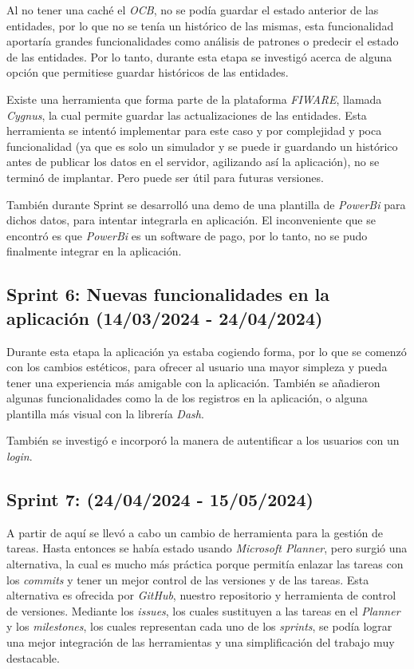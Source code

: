 Al no tener una caché el \textit{OCB}, no se podía guardar el estado anterior de las entidades, por lo que no se tenía un histórico de las mismas, esta funcionalidad aportaría grandes funcionalidades como análisis de patrones o predecir el estado de las entidades. Por lo tanto, durante esta etapa se investigó acerca de alguna opción que permitiese guardar históricos de las entidades.

Existe una herramienta que forma parte de la plataforma \textit{FIWARE}, llamada \textit{Cygnus}, la cual permite guardar las actualizaciones de las entidades. Esta herramienta se intentó implementar para este caso y por complejidad y poca funcionalidad (ya que es solo un simulador y se puede ir guardando un histórico antes de publicar los datos en el servidor, agilizando así la aplicación), no se terminó de implantar. Pero puede ser útil para futuras versiones.

También durante Sprint se desarrolló una demo de una plantilla de \textit{PowerBi} para dichos datos, para intentar integrarla en aplicación. El inconveniente que se encontró es que \textit{PowerBi} es un software de pago, por lo tanto, no se pudo finalmente integrar en la aplicación.



\subsection{Sprint 6: Nuevas funcionalidades en la aplicación (14/03/2024 - 24/04/2024)}

Durante esta etapa la aplicación ya estaba cogiendo forma, por lo que se comenzó con los cambios estéticos, para ofrecer al usuario una mayor simpleza y pueda tener una experiencia más amigable con la aplicación.
También se añadieron algunas funcionalidades como la de los registros en la aplicación, o alguna plantilla más visual con la librería \textit{Dash}.

También se investigó e incorporó la manera de autentificar a los usuarios con un \textit{login}.


\subsection{Sprint 7: (24/04/2024 - 15/05/2024)}

A partir de aquí se llevó a cabo un cambio de herramienta para la gestión de tareas. Hasta entonces se había estado usando \textit{Microsoft Planner}, pero surgió una alternativa, la cual es mucho más práctica porque permitía enlazar las tareas con los \textit{commits} y tener un mejor control de las versiones y de las tareas. Esta alternativa es ofrecida por \textit{GitHub}, nuestro repositorio y herramienta de control de versiones. Mediante los \textit{issues}, los cuales sustituyen a las tareas en el \textit{Planner} y los \textit{milestones}, los cuales representan cada uno de los \textit{sprints}, se podía lograr una mejor integración de las herramientas y una simplificación del trabajo muy destacable.

